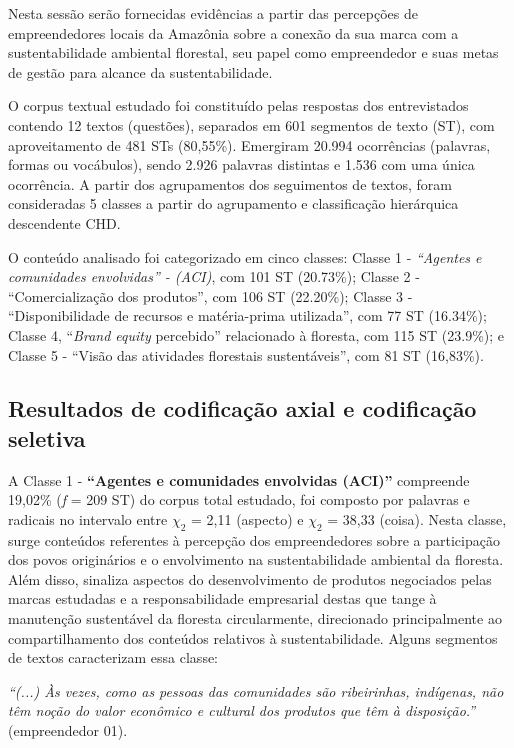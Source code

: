 Nesta sessão serão fornecidas evidências a partir das percepções de empreendedores locais da Amazônia sobre a conexão da sua marca com a sustentabilidade ambiental florestal, seu papel como empreendedor e suas metas de gestão para alcance da sustentabilidade.

O corpus textual estudado foi constituído pelas respostas dos entrevistados contendo 12 textos (questões), separados em 601 segmentos de texto (ST), com aproveitamento de 481 STs (80,55\%). Emergiram 20.994 ocorrências (palavras, formas ou vocábulos), sendo 2.926 palavras distintas e 1.536 com uma única ocorrência. A partir dos agrupamentos dos seguimentos de textos, foram consideradas 5 classes a partir do agrupamento e classificação hierárquica descendente CHD. 

O conteúdo analisado foi categorizado em cinco classes: Classe 1 - \textit{“Agentes e comunidades envolvidas” - (ACI)}, com 101 ST (20.73\%); Classe 2 - “Comercialização dos produtos”, com 106 ST (22.20\%); Classe 3 - “Disponibilidade de recursos e matéria-prima utilizada”, com 77 ST (16.34\%); Classe 4, “\textit{Brand equity} percebido” relacionado à floresta, com 115 ST (23.9\%); e Classe 5 - “Visão das atividades florestais sustentáveis”, com 81 ST (16,83\%).

\subsection{Resultados de codificação axial e codificação seletiva}

A Classe 1 - \textbf{“Agentes e comunidades envolvidas (ACI)”} compreende 19,02\% (\textit{f} = 209 ST) do corpus total estudado, foi composto por palavras e radicais no intervalo entre $\chi_2$ = 2,11 (aspecto) e $\chi_2$ = 38,33 (coisa). Nesta classe, surge conteúdos referentes à percepção dos empreendedores sobre a participação dos povos originários e o envolvimento na sustentabilidade ambiental da floresta. Além disso, sinaliza aspectos do desenvolvimento de produtos negociados pelas marcas estudadas e a responsabilidade empresarial destas que tange à manutenção sustentável da floresta circularmente, direcionado principalmente ao compartilhamento dos conteúdos relativos à sustentabilidade. Alguns segmentos de textos caracterizam essa classe:

\textit{“(...) Às vezes, como as pessoas das comunidades são ribeirinhas, indígenas, não têm noção do valor econômico e cultural dos produtos que têm à disposição.”} (empreendedor 01).

